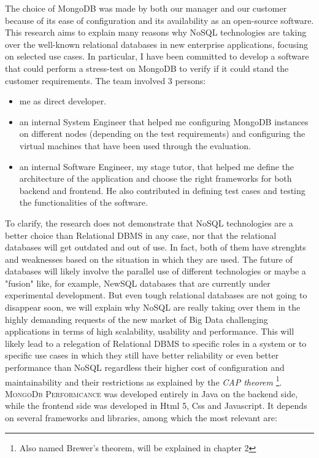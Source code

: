 The choice of MongoDB was made by both our manager and our customer because of its ease of configuration and its availability as 
an open-source software.
This research aims to explain many reasons why NoSQL technologies are taking over the well-known relational databases in new enterprise applications, focusing on selected use cases.
In particular, I have been committed to develop a software that could perform a stress-test on MongoDB to verify if it could stand the customer requirements.
The team involved 3 persons:
\begin{itemize}
  \item me as direct developer.
  \item an internal System Engineer that helped me configuring MongoDB instances on different nodes (depending on the test requirements) and configuring the virtual machines that have been used through the evaluation.
  \item an internal Software Engineer, my stage tutor, that helped me define the architecture of the application and choose the right frameworks for both backend and frontend. He also contributed in defining test cases and testing the functionalities of the software.
\end{itemize}
To clarify, the research does not demonstrate that NoSQL technologies are a better choice than Relational DBMS in any case, nor that the relational databases will get outdated and out of use.
In fact, both of them have strenghts and weaknesses based on the situation in which they are used.
The future of databases will likely involve the parallel use of different technologies or maybe a "fusion" like, for example, NewSQL databases that are currently under experimental development.
But even tough relational databases are not going to disappear soon, we will explain why NoSQL are really taking over them in the highly demanding requests of the new market of Big Data challenging applications in terms of high scalability, usability and performance.
This will likely lead to a relegation of Relational DBMS to specific roles in a system or to specific use cases in which they still have better reliability or even better performance than NoSQL regardless their higher cost of configuration and maintainability and their restrictions as explained by the \textit{CAP theorem} \footnote{Also named Brewer's theorem, will be explained in chapter 2}.
\textsc{MongoDb Performcance} was developed entirely in Java on the backend side, while the frontend side was developed in Html 5, Css and Javascript.
It depends on several frameworks and libraries, among which the most relevant are:
